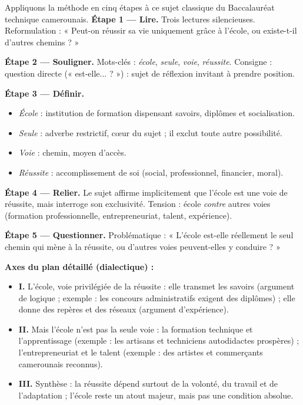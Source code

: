 \documentclass[11pt]{article}
\begin{document}
\begin{exoresolu}
Appliquons la méthode en cinq étapes à ce sujet classique du Baccalauréat technique camerounais.
\tcblower
\textbf{Étape 1 — Lire.} Trois lectures silencieuses. Reformulation : « Peut-on réussir sa vie uniquement grâce à l'école, ou existe-t-il d'autres chemins ? »

\textbf{Étape 2 — Souligner.} Mots-clés : \emph{école}, \emph{seule}, \emph{voie}, \emph{réussite}. Consigne : question directe (« est-elle... ? ») : sujet de réflexion invitant à prendre position.

\textbf{Étape 3 — Définir.}
\begin{itemize}
\item \emph{École} : institution de formation dispensant savoirs, diplômes et socialisation.
\item \emph{Seule} : adverbe restrictif, cœur du sujet ; il exclut toute autre possibilité.
\item \emph{Voie} : chemin, moyen d'accès.
\item \emph{Réussite} : accomplissement de soi (social, professionnel, financier, moral).
\end{itemize}

\textbf{Étape 4 — Relier.} Le sujet affirme implicitement que l'école est une voie de réussite, mais interroge son exclusivité. Tension : école \emph{contre} autres voies (formation professionnelle, entrepreneuriat, talent, expérience).

\textbf{Étape 5 — Questionner.} Problématique : « L'école est-elle réellement le seul chemin qui mène à la réussite, ou d'autres voies peuvent-elles y conduire ? »

\textbf{Axes du plan détaillé (dialectique) :}
\begin{itemize}
\item \textbf{I.} L'école, voie privilégiée de la réussite : elle transmet les savoirs (argument de logique ; exemple : les concours administratifs exigent des diplômes) ; elle donne des repères et des réseaux (argument d'expérience).
\item \textbf{II.} Mais l'école n'est pas la seule voie : la formation technique et l'apprentissage (exemple : les artisans et techniciens autodidactes prospères) ; l'entrepreneuriat et le talent (exemple : des artistes et commerçants camerounais reconnus).
\item \textbf{III.} Synthèse : la réussite dépend surtout de la volonté, du travail et de l'adaptation ; l'école reste un atout majeur, mais pas une condition absolue.
\end{itemize}
\end{exoresolu}
\end{document}
